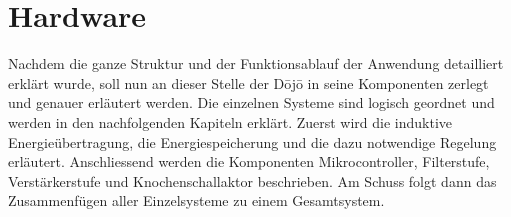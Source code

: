 \section{Hardware}\label{sec:hardware}
Nachdem die ganze Struktur und der Funktionsablauf der Anwendung detailliert erklärt wurde, soll nun an dieser Stelle der Dōjō in seine Komponenten zerlegt und genauer erläutert werden. Die einzelnen Systeme sind logisch geordnet und werden in den nachfolgenden Kapiteln erklärt. Zuerst wird die induktive Energieübertragung, die Energiespeicherung und die dazu notwendige Regelung erläutert. Anschliessend werden die Komponenten Mikrocontroller, Filterstufe, Verstärkerstufe und Knochenschallaktor beschrieben. Am Schuss folgt dann das Zusammenfügen aller Einzelsysteme zu einem Gesamtsystem.